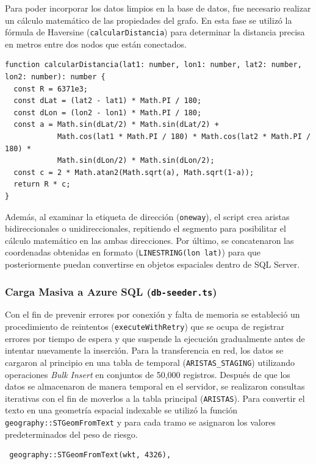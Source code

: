Para poder incorporar los datos limpios en la base de datos, fue necesario realizar un cálculo matemático de las propiedades del grafo. En esta fase se utilizó la fórmula de Haversine (\texttt{calcularDistancia}) para determinar la distancia precisa en metros entre dos nodos que están conectados.

\begin{lstlisting}
function calcularDistancia(lat1: number, lon1: number, lat2: number, lon2: number): number {
  const R = 6371e3;
  const dLat = (lat2 - lat1) * Math.PI / 180;
  const dLon = (lon2 - lon1) * Math.PI / 180;
  const a = Math.sin(dLat/2) * Math.sin(dLat/2) +
            Math.cos(lat1 * Math.PI / 180) * Math.cos(lat2 * Math.PI / 180) *
            Math.sin(dLon/2) * Math.sin(dLon/2);
  const c = 2 * Math.atan2(Math.sqrt(a), Math.sqrt(1-a));
  return R * c;
}   
\end{lstlisting}

Además, al examinar la etiqueta de dirección (\texttt{oneway}), el script crea aristas bidireccionales o unidireccionales, repitiendo el segmento para posibilitar el cálculo matemático en las ambas direcciones. Por último, se concatenaron las coordenadas obtenidas en formato (\texttt{LINESTRING(lon lat)}) para que posteriormente puedan convertirse en objetos espaciales dentro de SQL Server.

\subsubsection*{\hspace{0.7cm}Carga Masiva a Azure SQL (\texttt{db-seeder.ts})}

Con el fin de prevenir errores por conexión y falta de memoria se estableció un procedimiento de reintentos (\texttt{executeWithRetry}) que se ocupa de registrar errores por tiempo de espera y que suspende la ejecución gradualmente antes de intentar nuevamente la inserción. Para la transferencia en red, los datos se cargaron al principio en una tabla de temporal (\texttt{ARISTAS\_STAGING}) utilizando operaciones \textit{Bulk Insert} en conjuntos de 50{,}000 registros. Después de que los datos se almacenaron de manera temporal en el servidor, se realizaron consultas iterativas con el fin de moverlos a la tabla principal (\texttt{ARISTAS}). Para convertir el texto en una geometría espacial indexable se utilizó la función \texttt{geography::STGeomFromText} y para cada tramo se asignaron los valores predeterminados del peso de riesgo.
\begin{lstlisting}
 geography::STGeomFromText(wkt, 4326),
\end{lstlisting}

